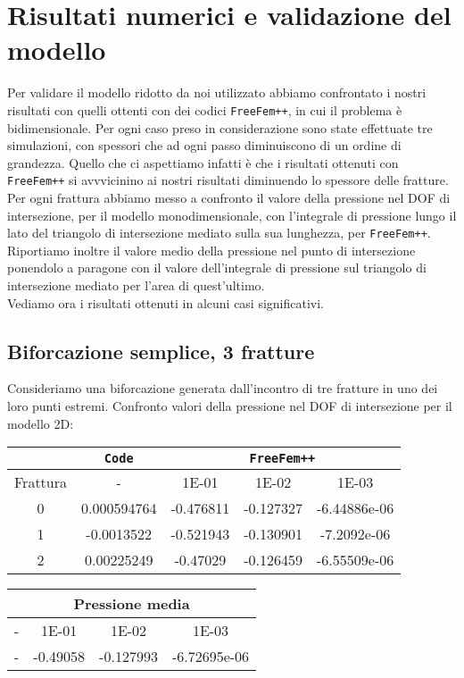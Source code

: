 \chapter{Risultati numerici e validazione del modello} 
Per validare il modello ridotto da noi utilizzato abbiamo confrontato i nostri risultati con quelli ottenti con dei codici \texttt{FreeFem++}, in cui il problema è bidimensionale. Per ogni caso preso in considerazione sono state effettuate tre simulazioni, con spessori che ad ogni passo diminuiscono di un ordine di grandezza. Quello che ci aspettiamo infatti è che i risultati ottenuti con \texttt{FreeFem++}  si avvvicinino ai nostri risultati diminuendo lo spessore delle fratture.\\
\noindent Per ogni frattura abbiamo messo a confronto il valore della pressione nel DOF di intersezione, per il modello monodimensionale, con l'integrale di pressione lungo il lato del triangolo di intersezione mediato sulla sua lunghezza, per \texttt{FreeFem++}.
Riportiamo inoltre il valore medio della pressione nel punto di intersezione ponendolo a paragone con il valore dell'integrale di pressione sul triangolo di intersezione mediato per l'area di quest'ultimo.\\
Vediamo ora i risultati ottenuti in alcuni casi significativi.
\section{Biforcazione semplice, 3 fratture}
Consideriamo una biforcazione generata dall'incontro di tre fratture in uno dei loro punti estremi.
Confronto valori della pressione nel DOF di intersezione per il modello 2D:\\
\begin{center}
\begin{tabular}{|c|c|c|c|c|}
\hline
 & \textbf{\texttt{Code}} & \multicolumn{3}{|c|}{\textbf{\texttt{FreeFem++}}} \\
\hline
\multicolumn{1}{|c|}{Frattura} & - &
\multicolumn{1}{|c|}{1E-01} & 1E-02 & 1E-03 \\
\hline
 0 & 0.000594764 & -0.476811 & -0.127327 & -6.44886e-06\\
 1 & -0.0013522 & -0.521943 & -0.130901 & -7.2092e-06\\
 2 & 0.00225249 & -0.47029 & -0.126459 & -6.55509e-06\\
\hline
\end{tabular}
\end{center}

\begin{center}
\begin{tabular}{|c|c|c|c|}
\hline
\multicolumn{4}{|c|}{Pressione media}
\hline
\textbf{\texttt{Code}} & \multicolumn{3}{|c|}{\textbf{\texttt{FreeFem++}}} \\ 
\hline
- & \multicolumn{1}{|c|}{1E-01} & 1E-02 & 1E-03 \\
\hline
   - & -0.49058 & -0.127993 & -6.72695e-06 \\
\hline
\end{tabular}
\end{center}



